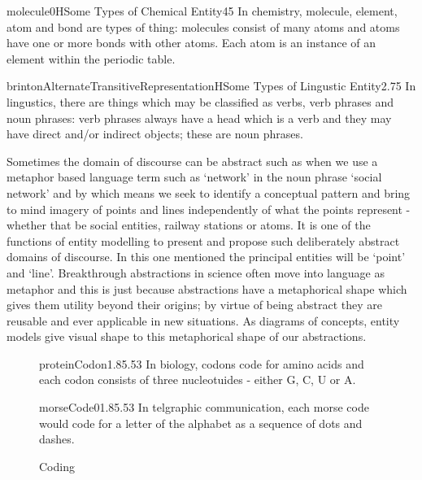 \begin{ernotedDimFig}{molecule0}{H}{Some Types of Chemical Entity}{4}{5}
In chemistry, molecule, element, atom and bond are types of thing: molecules consist of many atoms and atoms have one or more bonds with other atoms. Each atom is an instance of an element within the periodic table.   
\end{ernotedDimFig}

\begin{ernotedDimFig}{brintonAlternateTransitiveRepresentation}{H}{Some Types of Lingustic Entity}{2.7}{5}
In lingustics, there are things which may be classified as verbs, verb phrases and noun phrases: verb phrases always have a head which is a verb and they may have direct and/or indirect objects; these are noun phrases.  
\end{ernotedDimFig}

\noindent Sometimes the domain of discourse can be abstract such as when we use a metaphor based language term such as `network' in the noun phrase `social network' and by which means we seek to identify a conceptual pattern and bring to mind imagery of points and lines independently of what the points represent - whether that be social entities, railway stations or atoms.  It is one of the functions of entity modelling to present and propose such deliberately abstract domains of discourse. In this one mentioned the principal entities will be `point' and `line'. Breakthrough abstractions in science often move into language as metaphor and this is just because abstractions have a metaphorical shape which gives them utility beyond their origins; by virtue of being abstract they are reusable and ever applicable in new situations. As diagrams of concepts, entity models give visual shape to this metaphorical shape of our abstractions.  \\

\begin{erexample}
\begin{figure}[H]
\caption{Coding}
\begin{ernotedModel}{proteinCodon}{1.8}{5.5}{3}
In biology, codons code for amino acids and each codon consists of three nucleotuides - either G, C, U or A. 
\end{ernotedModel}
\vspace{0.5cm}
\begin{ernotedModel}{morseCode0}{1.8}{5.5}{3}
In telgraphic communication, each morse code would code for a letter of the alphabet as a sequence of dots and dashes.
\end{ernotedModel}
\vspace{0.2cm}
\end{figure}
\end{erexample}

